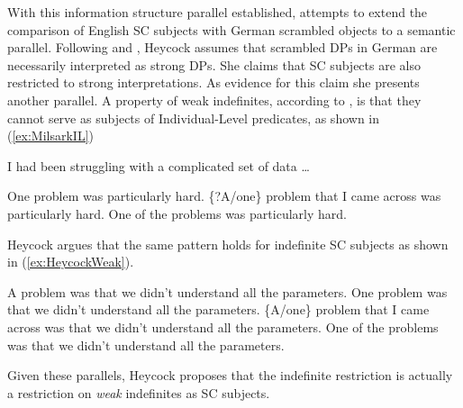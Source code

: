 \documentclass[
	letterpaper,
]{article}
\begin{document}
With this information structure parallel established, \textcite{heycock2012specification} attempts to extend the comparison of English SC subjects with German scrambled objects to a semantic parallel.
Following \textcite{dehoop1992case} and \textcite{diesing1992indefinites}, Heycock assumes that scrambled DPs in German are necessarily interpreted as strong DPs.
She claims that SC subjects are also restricted to strong interpretations.
As evidence for this claim she presents another parallel.
A property of weak indefinites, according to \textcite{milsark1974existential}, is that they cannot serve as subjects of Individual-Level predicates, as shown in (\ref{ex:MilsarkIL})
\begin{exe}
	\ex\label{ex:MilsarkIL} I had been struggling with a complicated set of data \ldots
	\begin{xlist}
		\ex One problem was particularly hard.
		\ex \{?A/one\} problem that I came across was particularly hard.
		\ex One of the problems was particularly hard.\hfill\parencite{heycock2012specification}
	\end{xlist}
\end{exe}
Heycock argues that the same pattern holds for indefinite SC subjects as shown in (\ref{ex:HeycockWeak}).
\begin{exe}
	\ex\label{ex:HeycockWeak}
\begin{xlist}
	\ex[?*] A problem was that we didn't understand all the parameters.
	\ex One problem was that we didn't understand all the parameters.
	\ex \{A/one\} problem that I came across was that we didn't understand all the parameters.
	\ex One of the problems was that we didn't understand all the parameters.\hfill\parencite{heycock2012specification}	
\end{xlist}
\end{exe}
Given these parallels, Heycock proposes that the indefinite restriction is actually a restriction on \textit{weak} indefinites as SC subjects.
\end{document}

